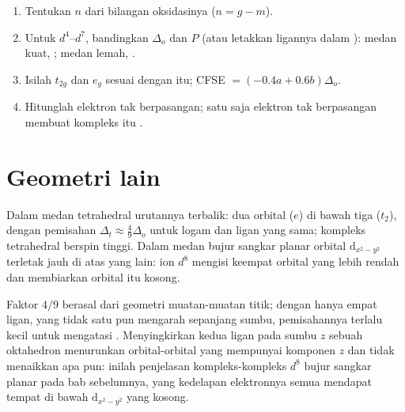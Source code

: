 \begin{method}\label{met:b2:ligand-field:spin-state}
\begin{enumerate}
  \item Tentukan $n$ dari bilangan oksidasinya ($n = g - m$).
  \item Untuk $d^4$--$d^7$, bandingkan $\Delta_o$ dan $P$ (atau letakkan
        ligannya dalam ): medan kuat, ; medan
        lemah, .
  \item Isilah $t_{2g}$ dan $e_g$ sesuai dengan itu; CFSE $= (-0.4a + 0.6b)\Delta_o$.
  \item Hitunglah elektron tak berpasangan; satu saja elektron tak
        berpasangan membuat kompleks itu .
\end{enumerate}
\end{method}

\section{Geometri lain}

\begin{proposition}\label{prop:b2:ligand-field:tetrahedral}
Dalam medan tetrahedral urutannya terbalik: dua orbital ($e$) di bawah tiga ($t_2$),
dengan pemisahan $\Delta_t \approx \frac49\Delta_o$ untuk logam dan ligan yang
sama; kompleks tetrahedral berspin tinggi. Dalam medan bujur sangkar planar
orbital $\mathrm d_{x^2-y^2}$ terletak jauh di atas yang lain: ion $d^8$
mengisi keempat orbital yang lebih rendah dan membiarkan orbital itu kosong.
\end{proposition}

\admitted

Faktor $4/9$ berasal dari geometri muatan-muatan titik; dengan hanya empat
ligan, yang tidak satu pun mengarah sepanjang sumbu, pemisahannya terlalu
kecil untuk mengatasi . Menyingkirkan kedua ligan pada
sumbu $z$ sebuah oktahedron menurunkan orbital-orbital yang mempunyai
komponen $z$ dan tidak menaikkan apa pun: inilah penjelasan kompleks-kompleks
$d^8$ bujur sangkar planar pada bab sebelumnya, yang kedelapan elektronnya
semua mendapat tempat di bawah $\mathrm d_{x^2-y^2}$ yang kosong.

